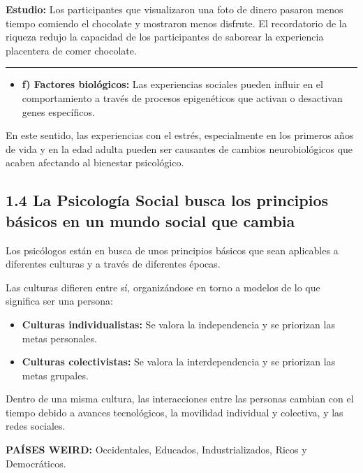 \documentclass[
]{website}
\providecommand{\tightlist}{%
  \setlength{\itemsep}{0pt}\setlength{\parskip}{0pt}}
\begin{document}
\textbf{Estudio:}
Los participantes que visualizaron una foto de dinero pasaron menos tiempo comiendo el chocolate y mostraron menos disfrute. El recordatorio de la riqueza redujo la capacidad de los participantes de saborear la experiencia placentera de comer chocolate.

\begin{center}\rule{0.5\linewidth}{0.5pt}\end{center}

\begin{itemize}
\tightlist
\item
  \textbf{f) Factores biológicos:} Las experiencias sociales pueden influir en el comportamiento a través de procesos epigenéticos que activan o desactivan genes específicos.
\end{itemize}

En este sentido, las experiencias con el estrés, especialmente en los primeros años de vida y en la edad adulta pueden ser causantes de cambios neurobiológicos que acaben afectando al bienestar psicológico.

\subsection*{1.4 La Psicología Social busca los principios básicos en un mundo social que cambia}\label{subtema1_4}

Los psicólogos están en busca de unos principios básicos que sean aplicables a diferentes culturas y a través de diferentes épocas.

Las culturas difieren entre sí, organizándose en torno a modelos de lo que significa ser una persona:

\begin{itemize}
\item
  \textbf{Culturas individualistas:} Se valora la independencia y se priorizan las metas personales.
\item
  \textbf{Culturas colectivistas:} Se valora la interdependencia y se priorizan las metas grupales.
\end{itemize}

Dentro de una misma cultura, las interacciones entre las personas cambian con el tiempo debido a avances tecnológicos, la movilidad individual y colectiva, y las redes sociales.

\textbf{PAÍSES WEIRD:} Occidentales, Educados, Industrializados, Ricos y Democráticos.
\end{document}
